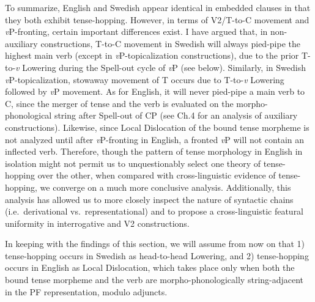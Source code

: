 To summarize, English and Swedish appear identical in embedded clauses in that they both exhibit tense-hopping. However, in terms of V2/T-to-C movement and {\it v}P-fronting, certain important differences exist. I have argued that, in non-auxiliary constructions, T-to-C movement in Swedish will always pied-pipe the highest main verb (except in \textit{v}P-topicalization constructions), due to the prior T-to-\textit{v} Lowering during the Spell-out cycle of \textit{v}P (see below). Similarly, in Swedish {\it v}P-topicalization, stowaway movement of T occurs due to T-to-{\it v} Lowering followed by {\it v}P movement. As for English, it will never pied-pipe a main verb to C, since the merger of tense and the verb is evaluated on the morpho-phonological string after Spell-out of CP (see Ch.4 for an analysis of auxiliary constructions). Likewise, since Local Dislocation of the bound tense morpheme is not analyzed until after {\it v}P-fronting in English, a fronted {\it v}P will not contain an inflected verb. Therefore, though the pattern of tense morphology in English in isolation might not permit us to unquestionably select one theory of tense-hopping over the other, when compared with cross-linguistic evidence of tense-hopping, we converge on a much more conclusive analysis. Additionally, this analysis has allowed us to more closely inspect the nature of syntactic chains (i.e.\ derivational vs.\ representational) and to propose a cross-linguistic featural uniformity in interrogative and V2 constructions.

In keeping with the findings of this section, we will assume from now on that 1) tense-hopping occurs in Swedish as head-to-head Lowering, and 2) tense-hopping occurs in English as Local Dislocation, which takes place only when both the bound tense morpheme and the verb are morpho-phonologically string-adjacent in the PF representation, modulo adjuncts.

